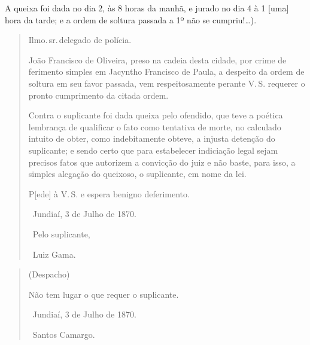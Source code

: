 A queixa foi dada no dia 2, às 8 horas da manhã, e jurado no dia 4 à 1
{[}uma{]} hora da tarde; e a ordem de soltura passada a 1º não se
cumpriu!\ldots{}).

\asterisc

\begin{quote}
Ilmo.\,sr.\,delegado de polícia.

João Francisco de Oliveira, preso na cadeia desta cidade, por crime de
ferimento simples em Jacyntho Francisco de Paula, a despeito da ordem de
soltura em seu favor passada, vem respeitosamente perante V.\,S. requerer
o pronto cumprimento da citada ordem.

Contra o suplicante foi dada queixa pelo ofendido, que teve a poética
lembrança de qualificar o fato como tentativa de morte, no calculado
intuito de obter, como indebitamente obteve, a injusta detenção do
suplicante; e sendo certo que para estabelecer indiciação legal sejam
precisos fatos que autorizem a convicção do juiz e não baste, para isso,
a simples alegação do queixoso, o suplicante, em nome da lei.

P{[}ede{]} à V.\,S. e espera benigno deferimento.

\medskip

\hfill\ Jundiaí, 3 de Julho de 1870.\smallskip

\hfill\ Pelo suplicante,

\hfill\ Luiz Gama.
\end{quote}

\begin{quote}
(Despacho)

Não tem lugar o que requer o suplicante.

\hfill\ Jundiaí, 3 de Julho de 1870.\smallskip

\hfill\ Santos Camargo.
\end{quote}

\asterisc

